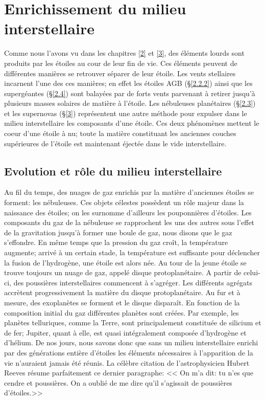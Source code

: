 
\chapterFormatfive

\chapter{Enrichissement du milieu interstellaire}\label{5}

\chapterFormat

Comme nous l'avons vu dans les chapitres \ref{2} et \ref{3}, des éléments lourds sont produits par les étoiles au cour de leur fin de vie. Ces éléments peuvent de différentes manières se retrouver séparer de leur étoile. Les vents stellaires incarnent l'une des ces manières; en effet les étoiles AGB (§\ref{2.2.2}) ainsi que les supergéantes (§\ref{2.4}) sont balayées par de forts vents parvenant à retirer jusqu'à plusieurs masses solaires de matière à l'étoile. Les nébuleuses planétaires (§\ref{2.3}) et les supernovas (§\ref{3}) représentent une autre méthode pour expulser dans le milieu interstellaire les composants d'une étoile. Ces deux phénomènes mettent le coeur d'une étoile à nu; toute la matière constituant les anciennes couches supérieures de l'étoile est maintenant éjectée dans le vide interstellaire. 

\section{Evolution et rôle du milieu interstellaire}\label{5.1}

Au fil du temps, des nuages de gaz enrichis par la matière d'anciennes étoiles se forment: les nébuleuses. Ces objets célestes possèdent un rôle majeur dans la naissance des étoiles; on les surnomme d'ailleurs les pouponnières d'étoiles. Les composants du gaz de la nébuleuse se rapprochent les uns des autres sous l'effet de la gravitation jusqu'à former une boule de gaz, nous disons que le gaz s'effondre. En même temps que la pression du gaz croît, la température augmente; arrivé à un certain stade, la température est suffisante pour déclencher la fusion de l'hydrogène, une étoile est alors née. Au tour de la jeune étoile se trouve toujours un nuage de gaz, appelé disque protoplanétaire. A partir de celui-ci, des poussières interstellaires commencent à s'agréger. Les différents agrégats accrètent progressivement la matière du disque protoplanétaire. Au fur et à mesure, des exoplanètes se forment et le disque disparaît. En fonction de la composition initial du gaz différentes planètes sont créées. Par exemple, les planètes telluriques, comme la Terre, sont principalement constituée de silicium et de fer; Jupiter, quant à elle, est quasi intégralement composée d'hydrogène et d'hélium. De nos jours, nous savons donc que sans un milieu interstellaire enrichi par des générations entière d'étoiles les éléments nécessaires à l'apparition de la vie n'auraient jamais été réunis. La célèbre citation de l'astrophysicien Hubert Reeves résume parfaitement ce dernier paragraphe: << On m'a dit: tu n'es que cendre et poussières. On a oublié de me dire qu'il s'agissait de poussières d'étoiles.>>


